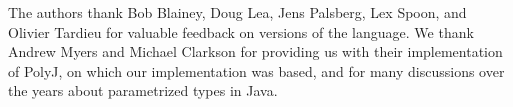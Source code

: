 \documentclass[preprint,nocopyrightspace,9pt]{sigplanconf}
\begin{document}
The authors thank Bob Blainey, 
Doug Lea, Jens Palsberg, Lex Spoon, and Olivier Tardieu
for valuable feedback on versions of the language.
We thank 
Andrew Myers and
Michael Clarkson for providing us with their implementation of
PolyJ, on which our implementation was based, and for many
discussions over the years about parametrized types in Java.





% 
\end{document}
